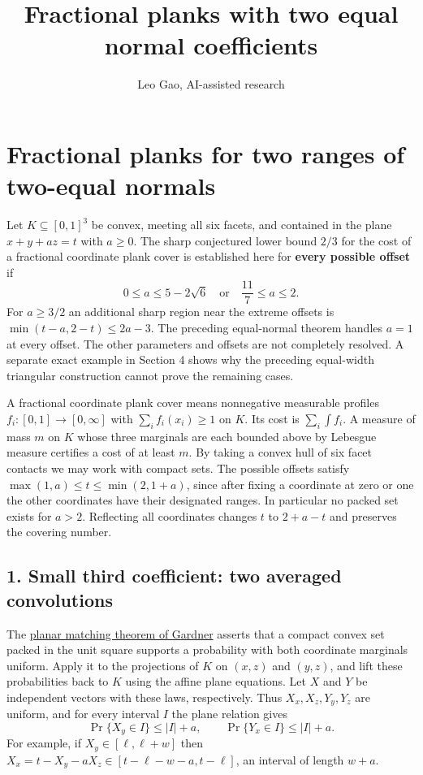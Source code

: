 \documentclass[
  10pt,
]{article}
\title{Fractional planks with two equal normal coefficients}
\author{Leo Gao, AI-assisted research}
\date{}
\begin{document}
\maketitle

\section{Fractional planks for two ranges of two-equal
normals}\label{fractional-planks-for-two-ranges-of-two-equal-normals}



Let \(K\subseteq[0,1]^3\) be convex, meeting all six facets, and
contained in the plane \(x+y+az=t\) with \(a\ge0\). The sharp
conjectured lower bound \(2/3\) for the cost of a fractional coordinate
plank cover is established here for \textbf{every possible offset} if \[
 0\le a\le 5-2\sqrt6\quad\text{or}\quad \frac{11}{7}\le a\le2 .
\] For \(a\ge3/2\) an additional sharp region near the extreme offsets
is \(\min(t-a,2-t)\le2a-3\). The preceding equal-normal theorem handles
\(a=1\) at every offset. The other parameters and offsets are not
completely resolved. A separate exact example in Section 4 shows why the
preceding equal-width triangular construction cannot prove the remaining
cases.

A fractional coordinate plank cover means nonnegative measurable
profiles \(f_i:[0,1]\to[0,\infty]\) with \(\sum_i f_i(x_i)\ge1\) on
\(K\). Its cost is \(\sum_i\int f_i\). A measure of mass \(m\) on \(K\)
whose three marginals are each bounded above by Lebesgue measure
certifies a cost of at least \(m\). By taking a convex hull of six facet
contacts we may work with compact sets. The possible offsets satisfy
\(\max(1,a)\le t\le\min(2,1+a)\), since after fixing a coordinate at
zero or one the other coordinates have their designated ranges. In
particular no packed set exists for \(a>2\). Reflecting all coordinates
changes \(t\) to \(2+a-t\) and preserves the covering number.

\subsection{1. Small third coefficient: two averaged
convolutions}\label{small-third-coefficient-two-averaged-convolutions}

The \href{https://msp.org/pjm/1988/135-2/pjm-v135-n2-p06-s.pdf}{planar
matching theorem of Gardner} asserts that a compact convex set packed in
the unit square supports a probability with both coordinate marginals
uniform. Apply it to the projections of \(K\) on \((x,z)\) and
\((y,z)\), and lift these probabilities back to \(K\) using the affine
plane equations. Let \(X\) and \(Y\) be independent vectors with these
laws, respectively. Thus \(X_x,X_z,Y_y,Y_z\) are uniform, and for every
interval \(I\) the plane relation gives \[
 \Pr\{X_y\in I\}\le |I|+a,\qquad \Pr\{Y_x\in I\}\le |I|+a.
\] For example, if \(X_y\in[\ell,\ell+w]\) then
\(X_x=t-X_y-aX_z\in[t-\ell-w-a,t-\ell]\), an interval of length \(w+a\).
\end{document}
